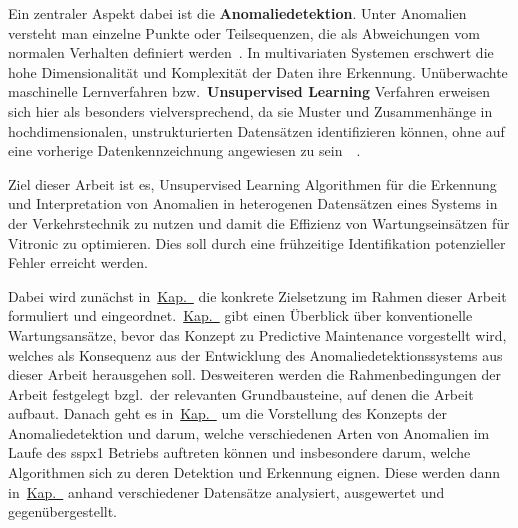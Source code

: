 Ein zentraler Aspekt dabei ist die \textbf{Anomaliedetektion}. Unter Anomalien versteht man einzelne Punkte oder Teilsequenzen, die als Abweichungen
vom normalen Verhalten definiert werden~\cite{Chandola2009}. In multivariaten Systemen erschwert die hohe Dimensionalität und Komplexität der
Daten ihre Erkennung. Unüberwachte maschinelle Lernverfahren bzw.~\textbf{Unsupervised Learning} Verfahren erweisen sich hier als besonders vielversprechend,
da sie Muster und Zusammenhänge in hochdimensionalen, unstrukturierten Datensätzen identifizieren können, ohne auf eine vorherige
Datenkennzeichnung angewiesen zu sein~\cite{Chandola2009}~\cite[S.~22--24]{Wenig2024}.

Ziel dieser Arbeit ist es, Unsupervised Learning Algorithmen für die Erkennung und Interpretation von Anomalien in
heterogenen Datensätzen eines Systems in der Verkehrstechnik zu nutzen und damit die Effizienz von Wartungseinsätzen für
Vitronic zu optimieren. Dies soll durch eine frühzeitige Identifikation potenzieller Fehler erreicht werden.

Dabei wird zunächst in~\hyperref[ch:zielsetzung]{Kap.~} die konkrete Zielsetzung im Rahmen dieser Arbeit formuliert
und eingeordnet.~\hyperref[ch:pdm_theorie]{Kap.~} gibt einen Überblick über konventionelle Wartungsansätze,
bevor das Konzept zu Predictive Maintenance vorgestellt wird, welches als Konsequenz aus der Entwicklung des Anomaliedetektionssystems
aus dieser Arbeit herausgehen soll. Desweiteren werden die Rahmenbedingungen der Arbeit festgelegt bzgl.~der relevanten Grundbausteine,
auf denen die Arbeit aufbaut. Danach geht es in~\hyperref[ch:anomalien]{Kap.~} um die Vorstellung des Konzepts der
Anomaliedetektion und darum, welche verschiedenen Arten von Anomalien im Laufe des \ac{sspx1} Betriebs auftreten können und insbesondere
darum, welche Algorithmen sich zu deren Detektion und Erkennung eignen. Diese werden dann
in~\hyperref[ch:anomaliedetektion_test]{Kap.~} anhand verschiedener Datensätze analysiert,
ausgewertet und gegenübergestellt.

